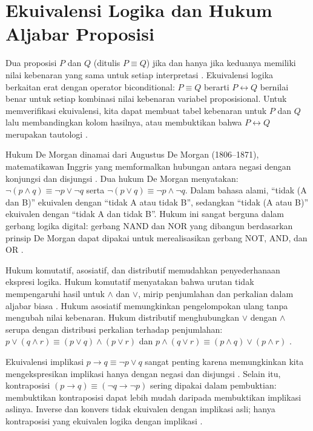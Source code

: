 \section{Ekuivalensi Logika dan Hukum Aljabar Proposisi}

Dua proposisi $P$ dan $Q$  (ditulis $P \equiv Q$) jika dan hanya jika keduanya memiliki nilai kebenaran yang sama untuk setiap interpretasi \cite{rosen2019,forallx}. Ekuivalensi logika berkaitan erat dengan operator biconditional: $P \equiv Q$ berarti $P \leftrightarrow Q$ bernilai benar untuk setiap kombinasi nilai kebenaran variabel proposisional. Untuk memverifikasi ekuivalensi, kita dapat membuat tabel kebenaran untuk $P$ dan $Q$ lalu membandingkan kolom hasilnya, atau membuktikan bahwa $P \leftrightarrow Q$ merupakan tautologi \cite{libretexts_logic,libretexts_equiv}.

Hukum De Morgan dinamai dari Augustus De Morgan (1806--1871), matematikawan Inggris yang memformalkan hubungan antara negasi dengan konjungsi dan disjungsi \cite{brilliant_de_morgan}. Dua hukum De Morgan menyatakan: $\neg(p \wedge q) \equiv \neg p \vee \neg q$ serta $\neg(p \vee q) \equiv \neg p \wedge \neg q$. Dalam bahasa alami, ``tidak (A dan B)'' ekuivalen dengan ``tidak A atau tidak B'', sedangkan ``tidak (A atau B)'' ekuivalen dengan ``tidak A dan tidak B''. Hukum ini sangat berguna dalam gerbang logika digital: gerbang NAND dan NOR yang dibangun berdasarkan prinsip De Morgan dapat dipakai untuk merealisasikan gerbang NOT, AND, dan OR \cite{rosen2019,brilliant_de_morgan}.

Hukum komutatif, asosiatif, dan distributif memudahkan penyederhanaan ekspresi logika. Hukum komutatif menyatakan bahwa urutan tidak mempengaruhi hasil untuk $\wedge$ dan $\vee$, mirip penjumlahan dan perkalian dalam aljabar biasa \cite{rosen2019}. Hukum asosiatif memungkinkan pengelompokan ulang tanpa mengubah nilai kebenaran. Hukum distributif menghubungkan $\vee$ dengan $\wedge$ serupa dengan distribusi perkalian terhadap penjumlahan: $p \vee (q \wedge r) \equiv (p \vee q) \wedge (p \vee r)$ dan $p \wedge (q \vee r) \equiv (p \wedge q) \vee (p \wedge r)$ \cite{levin_discrete}.

Ekuivalensi implikasi $p \rightarrow q \equiv \neg p \vee q$ sangat penting karena memungkinkan kita mengekspresikan implikasi hanya dengan negasi dan disjungsi \cite{rosen2019,copi2014}. Selain itu, kontraposisi $(p \rightarrow q) \equiv (\neg q \rightarrow \neg p)$ sering dipakai dalam pembuktian: membuktikan kontraposisi dapat lebih mudah daripada membuktikan implikasi aslinya. Inverse dan konvers tidak ekuivalen dengan implikasi asli; hanya kontraposisi yang ekuivalen logika dengan implikasi \cite{copi2014}.

